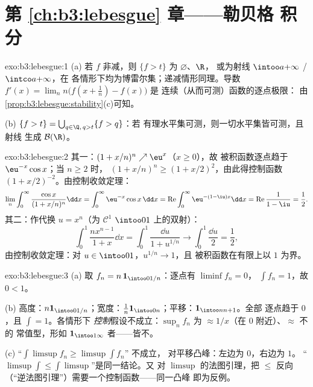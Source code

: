 \section*{第 \ref{ch:b3:lebesgue} 章——勒贝格
积分}

\begin{solution}{exo:b3:lebesgue:1}
(a) 若 $f$ 非减，则 $\{f > t\}$ 为 $\varnothing$、$\R$，
或为射线 $\intoo a{+\infty}$ / $\intco a{+\infty}$，在
各情形下均为博雷尔集；递减情形同理。导数 $f'(x) =
\lim_n n\bigl(f(x + \frac1n) - f(x)\bigr)$ 是
连续（从而可测）函数的逐点极限：
由\cref{prop:b3:lebesgue:stability}(c)可知。

(b) $\{f > t\} = \bigcup_{q \in \Q,\, q > t}\{f > q\}$：若
有理水平集可测，则一切水平集皆可测，且射线
生成 $\mathcal B(\R)$。
\end{solution}

\begin{solution}{exo:b3:lebesgue:2}
其一：$(1 + x/n)^n \nearrow \eu^x$（$x \geq 0$），故
被积函数逐点趋于 $\eu^{-x}\cos x$；当 $n \geq 2$ 时，
$(1 + x/n)^n \geq (1 + x/2)^2$，由此得控制函数
$(1 + x/2)^{-2}$。由控制收敛定理：
\[
\lim_n\int_0^\infty\frac{\cos x}{(1 + x/n)^n}\dd x
= \int_0^\infty \eu^{-x}\cos x\,\dd x
= \operatorname{Re}\int_0^\infty\eu^{-(1 - \iu)x}\dd x
= \operatorname{Re}\frac{1}{1 - \iu} = \frac12 .
\]
其二：作代换 $u = x^n$（为 $\mathcal C^1$
$\intoo01$ 上的双射）：
\[
\int_0^1\frac{nx^{n-1}}{1 + x}\dd x = \int_0^1\frac{\dd u}{1 +
u^{1/n}} \longrightarrow \int_0^1\frac{\dd u}{2} = \frac12,
\]
由控制收敛定理：对 $u \in \intoo01$，$u^{1/n} \to 1$，且
被积函数在有限上以 $1$ 为界。
\end{solution}

\begin{solution}{exo:b3:lebesgue:3}
(a) 取 $f_n = n\,\mathbf 1_{\intoo0{1/n}}$：逐点有 $\liminf f_n = 0$，
$\int f_n = 1$，故 $0 < 1$。

(b) 高度：$n\mathbf 1_{\intoo0{1/n}}$；宽度：$\frac1n\mathbf
1_{\intoo0n}$；平移：$\mathbf 1_{\intoo n{n+1}}$。全部
逐点趋于 $0$，且 $\int = 1$。各情形下
\emph{控制}假设不成立：$\sup_nf_n$ 为
$\approx 1/x$（在 $0$ 附近）、$\approx$ 不的
常值型，形如 $\mathbf 1_{\intoo1\infty}$ 者——皆不。

(c) “$\int\limsup f_n \geq \limsup\int f_n$” 不成立，
对平移凸峰：左边为 $0$，右边为 $1$。
“$\limsup\int \leq \int\limsup$”是同一结论。又
对 $\limsup$ 的法图引理，把 $\leq$ 反向
（“逆法图引理”）需要一个控制函数——同一凸峰
即为反例。
\end{solution}

